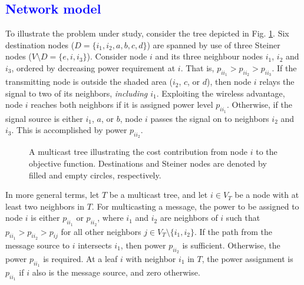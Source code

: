 \textcolor{blue}{\subsection{Network model} \label{sec:netmod}}

To illustrate the problem under study, consider the tree depicted in Fig. \ref{fig:objexp}.
Six destination nodes ($D=\{i_1,i_2,a,b,c,d\}$) are spanned by use of three Steiner nodes ($V\setminus D = \{e,i,i_3\}$).
Consider node $i$ and its three neighbour nodes $i_1$, $i_2$ and $i_3$, ordered by decreasing power requirement at $i$.
That is, $p_{ii_1}>p_{ii_2}>p_{ii_3}$.
If the transmitting node is outside the shaded area ($i_2$, $c$, or $d$), then node $i$ relays the signal to two of its neighbors, \emph{including $i_1$}.
Exploiting the wireless advantage, node $i$ reaches both neighbors if it is assigned power level $p_{ii_1}$.
Otherwise, if the signal source is either $i_1$, $a$, or $b$, node $i$ passes the signal on to neighbors $i_2$ and $i_3$.
This is accomplished by power $p_{ii_2}$.

\begin{figure}[h!]
\centering
{}
\caption{A multicast tree illustrating the cost contribution from node $i$ to the objective function.
	 Destinations and Steiner nodes are denoted by filled and empty circles, respectively.}
\label{fig:objexp}
\end{figure}

In more general terms, let $T$ be a multicast tree, and let $i\in V_T$ be a node with at least two neighbors in $T$.
For multicasting a message, the power to be assigned to node $i$ is either $p_{ii_1}$ or $p_{ii_2}$, where $i_1$ and $i_2$ are neighbors of $i$ such that
$p_{ii_1}>p_{ii_2}>p_{ij}$ for all other neighbors $j\in V_T\setminus\{i_1,i_2\}$.
If the path from the message source to $i$ intersects $i_1$, then power $p_{ii_2}$ is sufficient.
Otherwise, the power $p_{ii_1}$ is required.
At a leaf $i$ with neighbor $i_1$ in $T$, the power assignment is $p_{ii_1}$ if $i$ also is the message source, and zero otherwise.

